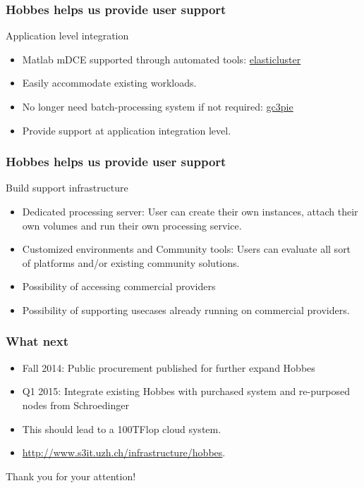 \documentclass[english,serif,mathserif,xcolor=pdftex,dvipsnames,table]{beamer}
\begin{document}
\begin{frame}
  \frametitle{Hobbes helps us provide user support}
  
  \begin{block}{Application level integration}
    \begin{itemize}
    \item Matlab mDCE supported through {\color{Blue}automated tools}:
      \href{http://gc3-uzh-ch.github.io/elasticluster/}{elasticluster}
    \item Easily accommodate {\color{Blue}existing workloads}.
    \item No longer need {\color{Blue}batch-processing} system if not
      required:
      \href{https://code.google.com/p/gc3pie/}{gc3pie}
    \item Provide support at {\color{Blue}application integration}
      level.
    \end{itemize}
  \end{block}
\end{frame}

\begin{frame}
  \frametitle{Hobbes helps us provide user support}
  
  \begin{block}{Build support infrastructure}
    \begin{itemize}
    \item {\color{Blue}Dedicated processing server}: User can create
      their own instances, attach their own volumes and
      run their own processing service.
    \item {\color{Blue}Customized environments and Community tools}:
      Users can evaluate all sort of platforms and/or
      existing community solutions.
    \item Possibility of accessing {\color{Blue}commercial providers}
    \item Possibility of supporting usecases {\color{Blue}already
        running} on commercial providers.
    \end{itemize}
  \end{block}
\end{frame}

\begin{frame}
  \frametitle{What next}

  \begin{itemize}
    \item {\color{Blue}Fall 2014}: Public procurement published for
      further expand Hobbes
    \item {\color{Blue}Q1 2015}: Integrate existing Hobbes with
      purchased system and re-purposed nodes from Schroedinger
    \item This should lead to a {\color{Blue}100TFlop} cloud system.
    \item \url{http://www.s3it.uzh.ch/infrastructure/hobbes}.
  \end{itemize}
\begin{center}
Thank you for your attention!
\end{center}
\end{frame}
\end{document}
